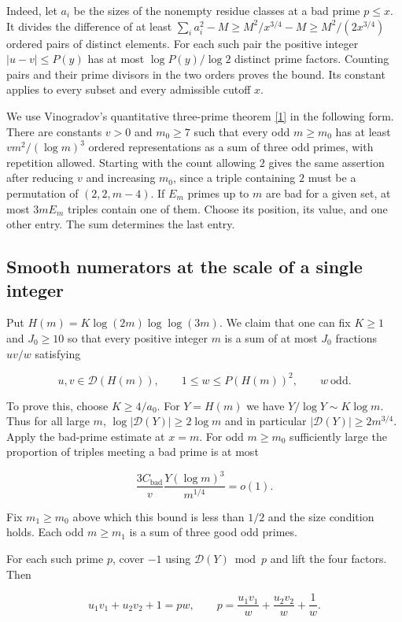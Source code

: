 \documentclass[11pt,a4paper]{article}
\begin{document}
Indeed, let $a_i$ be the sizes of the nonempty residue classes at a bad prime $p\le x$. It divides the difference of at least $\sum_i a_i^2-M\ge M^2/x^{3/4}-M\ge M^2/(2x^{3/4})$ ordered pairs of distinct elements. For each such pair the positive integer $|u-v|\le P(y)$ has at most $\log P(y)/\log 2$ distinct prime factors. Counting pairs and their prime divisors in the two orders proves the bound. Its constant applies to every subset and every admissible cutoff $x$.

We use Vinogradov's quantitative three-prime theorem \hyperlink{ref-1}{[1]} in the following form. There are constants $v>0$ and $m_0\ge7$ such that every odd $m\ge m_0$ has at least $vm^2/(\log m)^3$ ordered representations as a sum of three odd primes, with repetition allowed. Starting with the count allowing $2$ gives the same assertion after reducing $v$ and increasing $m_0$, since a triple containing $2$ must be a permutation of $(2,2,m-4)$. If $E_m$ primes up to $m$ are bad for a given set, at most $3mE_m$ triples contain one of them. Choose its position, its value, and one other entry. The sum determines the last entry.

\subsection{Smooth numerators at the scale of a single integer}

Put $H(m)=K\log(2m)\log\log(3m)$. We claim that one can fix $K\ge1$ and $J_0\ge10$ so that every positive integer $m$ is a sum of at most $J_0$ fractions $uv/w$ satisfying

\[
u,v\in\mathcal D(H(m)),\qquad
1\le w\le P(H(m))^2,\qquad w\ \text{odd}.
\]

To prove this, choose $K\ge4/a_0$. For $Y=H(m)$ we have $Y/\log Y\sim K\log m$. Thus for all large $m$, $\log|\mathcal D(Y)|\ge2\log m$ and in particular $|\mathcal D(Y)|\ge2m^{3/4}$. Apply the bad-prime estimate at $x=m$. For odd $m\ge m_0$ sufficiently large the proportion of triples meeting a bad prime is at most

\[
\frac{3C_{\mathrm{bad}}}{v}\frac{Y(\log m)^3}{m^{1/4}}=o(1).
\]

Fix $m_1\ge m_0$ above which this bound is less than $1/2$ and the size condition holds. Each odd $m\ge m_1$ is a sum of three good odd primes.

For each such prime $p$, cover $-1$ using $\mathcal D(Y)\bmod p$ and lift the four factors. Then

\[
u_1v_1+u_2v_2+1=pw,\qquad
p=\frac{u_1v_1}{w}+\frac{u_2v_2}{w}+\frac1w .
\]
\end{document}
